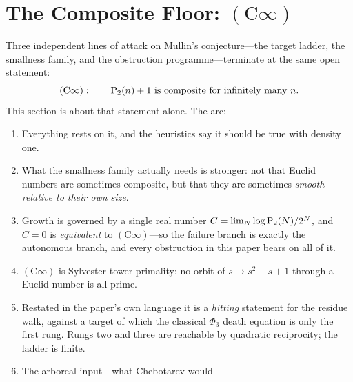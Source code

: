 \providecommand{\lpf}{\operatorname{lpf}}
\section{The Composite Floor: $(\mathrm{C}\infty)$}
\label{sec:cinfty}

\begin{roadmap}
Three independent lines of attack on Mullin's conjecture---the target
ladder, the smallness family, and the obstruction programme---terminate at
the same open statement:
\[
  (\mathrm{C}\infty):\qquad
  \mathrm{P}_{2}(n)+1 \text{ is composite for infinitely many } n .
\]
This section is about that statement alone.  The arc:
\begin{enumerate}[nosep,leftmargin=*]
\item[\S\ref{sec:cinfty-beneath}] Everything rests on it, and the
  heuristics say it should be true with density one.
\item[\S\ref{sec:growth-floor}] What the smallness family actually needs is
  stronger: not that Euclid numbers are sometimes composite, but that they
  are sometimes \emph{smooth relative to their own size}.
\item[\S\ref{sec:defect-telescope}] Growth is governed by a single real
  number $C = \lim_N \log\mathrm{P}_{2}(N)/2^N$, and $C = 0$ is \emph{equivalent}
  to $(\mathrm{C}\infty)$---so the failure branch is exactly the autonomous
  branch, and every obstruction in this paper bears on all of it.
\item[\S\ref{sec:sylvester-tower}] $(\mathrm{C}\infty)$ is Sylvester-tower
  primality: no orbit of $s \mapsto s^2-s+1$ through a Euclid number is
  all-prime.
\item[\S\ref{sec:backward-orbit}--\ref{sec:level-tower}] Restated in the
  paper's own language it is a \emph{hitting} statement for the residue
  walk, against a target of which the classical $\Phi_3$ death equation is
  only the first rung.  Rungs two and three are reachable by quadratic
  reciprocity; the ladder is finite.
\item[\S\ref{sec:arboreal}] The arboreal input---what Chebotarev would

\end{enumerate}
\end{roadmap}
